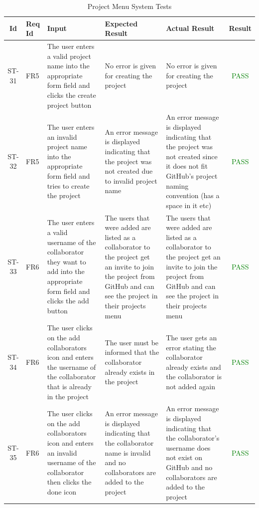 \documentclass[12pt, titlepage]{article}
\begin{document}
\begin{center}
    \begin{longtable}{|c|p{1cm}|p{2.7cm}|p{3cm}|p{3cm}|c|}
        \caption{Project Menu System Tests \label{long}}\\
        \hline
        \textbf{Id} & \textbf{Req Id} & \textbf{Input} & \textbf{Expected Result} & \textbf{Actual Result} & \textbf{Result}   \\
        \hline
        ST-31 & FR5 & The user enters a valid project name into the appropriate form field and clicks the create project button & No error is given for creating the project & No error is given for creating the project &  \textcolor{green}{PASS} \\
        \hline
        ST-32 & FR5 & The user enters an invalid project name into the appropriate form field and tries to create the project & An error message is displayed indicating that the project was not created due to invalid project name & An error message is displayed indicating that the project was not created since it does not fit GitHub's project naming convention (has a space in it etc) &  \textcolor{green}{PASS} \\
        \hline
        ST-33 & FR6 & The user enters a valid username of the collaborator they want to add into the appropriate form field and clicks the add button & The users that were added are listed as a collaborator to the project get an invite to join the project from GitHub and can see the project in their projects menu & The users that were added are listed as a collaborator to the project get an invite to join the project from GitHub and can see the project in their projects menu & \textcolor{green}{PASS} \\
        \hline
        ST-34 & FR6 &  The user clicks on the add collaborators icon and enters the username of the collaborator that is already in the project & The user must be informed that the collaborator already exists in the project & The user gets an error stating the collaborator already exists and the collaborator is not added again & \textcolor{green}{PASS} \\
        \hline
        ST-35 & FR6 & The user clicks on the add collaborators icon and enters an invalid username of the collaborator then clicks the done icon  & An error message is displayed indicating that the collaborator name is invalid and no collaborators are added to the project & An error message is displayed indicating that the collaborator's username does not exist on GitHub and no collaborators are added to the project & \textcolor{green}{PASS}\\

\end{longtable}
\end{center}
\end{document}
